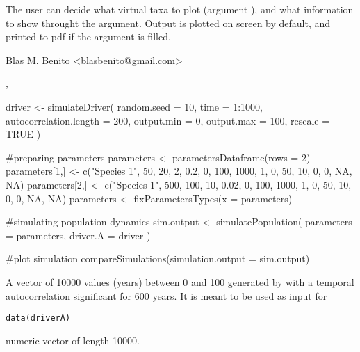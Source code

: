 \documentclass[letterpaper]{book}
\begin{document}
%
\begin{Details}\relax
The user can decide what virtual taxa to plot (argument ), and what information to show throught the  argument. Output is plotted on screen by default, and printed to pdf if the  argument is filled.
\end{Details}
%
\begin{Author}\relax
Blas M. Benito  <blasbenito@gmail.com>
\end{Author}
%
\begin{SeeAlso}\relax
{}, 
\end{SeeAlso}
%
\begin{Examples}
\begin{ExampleCode}

driver <- simulateDriver(
 random.seed = 10,
 time = 1:1000,
 autocorrelation.length = 200,
 output.min = 0,
 output.max = 100,
 rescale = TRUE
 )

#preparing parameters
parameters <- parametersDataframe(rows = 2)
parameters[1,] <- c("Species 1", 50, 20, 2, 0.2, 0, 100, 1000, 1, 0, 50, 10, 0, 0, NA, NA)
parameters[2,] <- c("Species 1", 500, 100, 10, 0.02, 0, 100, 1000, 1, 0, 50, 10, 0, 0, NA, NA)
parameters <- fixParametersTypes(x = parameters)

#simulating population dynamics
sim.output <- simulatePopulation(
 parameters = parameters,
 driver.A = driver
 )

#plot simulation
compareSimulations(simulation.output = sim.output)

\end{ExampleCode}
\end{Examples}
%
\begin{Description}\relax
A vector of 10000 values (years) between 0 and 100 generated by  with a temporal autocorrelation significant for 600 years. It is meant to be used as input for 
\end{Description}
%
\begin{Usage}
\begin{verbatim}
data(driverA)
\end{verbatim}
\end{Usage}
%
\begin{Format}
numeric vector of length 10000.
\end{Format}
\end{document}
